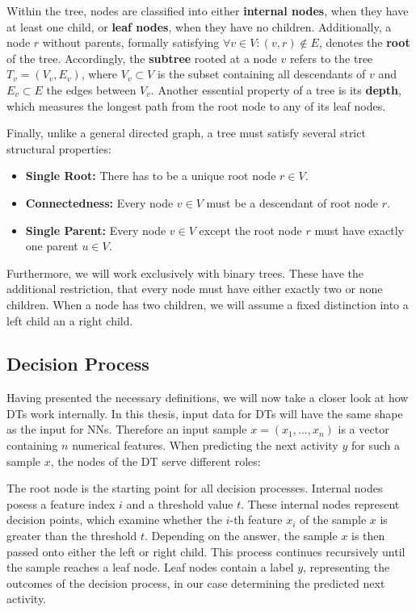 Within the tree, nodes are classified into either \textbf{internal nodes},
when they have at least one child, or \textbf{leaf nodes},
when they have no children.
Additionally, a node $r$ without parents, formally satisfying $\forall v \in V: (v,r) \notin E$,
denotes the \textbf{root} of the tree.
Accordingly, the \textbf{subtree} rooted at a node $v$ refers to the tree $T_v = (V_v, E_v)$,
where $V_v \subset V$ is the subset containing all descendants of $v$ 
and $E_v \subset E$ the edges between $V_v$.
Another essential property of a tree is its \textbf{depth},
which measures the longest path from the root node to any of its leaf nodes.

Finally, unlike a general directed graph, a tree must satisfy several strict structural properties:
\begin{itemize}
  \item \textbf{Single Root:} There has to be a unique root node $r \in V$.
  \item \textbf{Connectedness:} Every node $v \in V$ must be a descendant of root node $r$.
  \item \textbf{Single Parent:} Every node $v \in V$ except the root node $r$ must have exactly one parent $u \in V$.
\end{itemize}
Furthermore, we will work exclusively with binary trees.
These have the additional restriction, that every node must have either exactly two or none children.
When a node has two children, we will assume a fixed distinction into a left child an a right child.

\subsection{Decision Process}
Having presented the necessary definitions,
we will now take a closer look at how DTs work internally.
In this thesis, input data for DTs will have the same shape as the input for NNs.
Therefore an input sample $x = (x_1, ..., x_n)$ is a vector containing $n$ numerical features.
When predicting the next activity $y$ for such a sample $x$, the nodes of the DT serve different roles:

The root node is the starting point for all decision processes.
Internal nodes posess a feature index $i$ and a threshold value $t$.
These internal nodes represent decision points, which examine whether the $i$-th feature $x_i$ of the sample $x$
is greater than the threshold $t$.
Depending on the answer, the sample $x$ is then passed onto either the left or right child.
This process continues recursively until the sample reaches a leaf node.
Leaf nodes contain a label $y$, representing the outcomes of the decision process,
in our case determining the predicted next activity.

